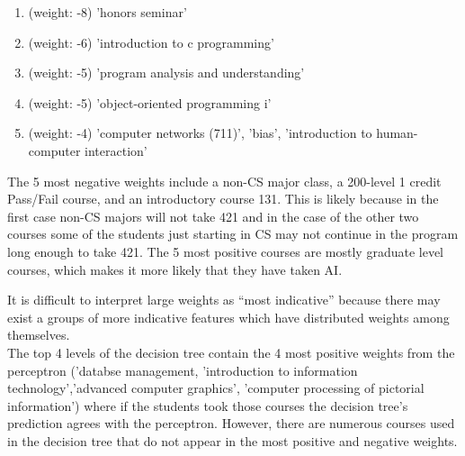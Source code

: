 \documentclass[a4paper,11pt]{article}
\begin{document}
\begin{enumerate}
\item (weight: -8) 'honors seminar'
\item (weight: -6) 'introduction to c programming'
\item  (weight: -5) 'program analysis and understanding'
\item (weight: -5) 'object-oriented programming i'
\item (weight: -4) 'computer networks (711)', 'bias',   'introduction to human-computer interaction' 
\end{enumerate}

The 5 most negative weights include a non-CS
major class, a 200-level 1 credit Pass/Fail course, and an
introductory course 131. This is likely
because in the first case non-CS majors will not take 421 and in the
case of the other two courses some of the students just starting in CS
may not continue in the program long enough to take 421. The 5 most positive
courses are mostly graduate level courses, which makes it more likely
that they have taken AI.

It is difficult to interpret large weights as ``most indicative'' because there may exist a groups of more indicative
features which have distributed weights among themselves.\\

The top 4 levels of the decision tree contain the 4 most positive weights
from the perceptron ('databse management, 'introduction to information
technology','advanced computer graphics', 'computer processing of
pictorial information') where if the students took those courses the
decision tree's prediction agrees with the perceptron. However, there
are numerous courses used in the decision tree that do not appear in
the most positive and negative weights. 
      
\end{document}
